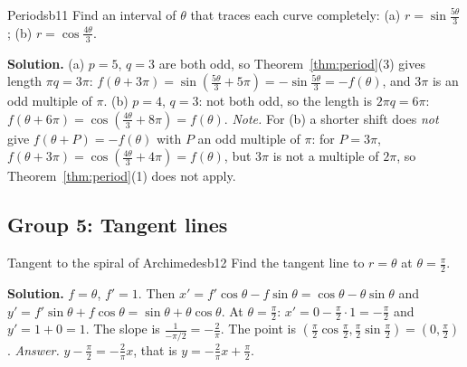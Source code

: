 \documentclass[11pt]{article}
\begin{document}
\begin{exmp}{Periods}{b11}
Find an interval of $\theta$ that traces each curve completely: (a) $r=\sin\frac{5\theta}3$; (b) $r=\cos\frac{4\theta}3$.

\textbf{Solution.} (a) $p=5$, $q=3$ are both odd, so Theorem~\ref{thm:period}(3) gives length $\pi q=3\pi$: $f(\theta+3\pi)=\sin\left(\frac{5\theta}3+5\pi\right)=-\sin\frac{5\theta}3=-f(\theta)$, and $3\pi$ is an odd multiple of $\pi$. (b) $p=4$, $q=3$: not both odd, so the length is $2\pi q=6\pi$: $f(\theta+6\pi)=\cos\left(\frac{4\theta}3+8\pi\right)=f(\theta)$. \emph{Note.} For (b) a shorter shift does \emph{not} give $f(\theta+P)=-f(\theta)$ with $P$ an odd multiple of $\pi$: for $P=3\pi$, $f(\theta+3\pi)=\cos(\frac{4\theta}3+4\pi)=f(\theta)$, but $3\pi$ is not a multiple of $2\pi$, so Theorem~\ref{thm:period}(1) does not apply.
\end{exmp}

\subsection*{Group 5: Tangent lines}

\begin{exmp}{Tangent to the spiral of Archimedes}{b12}
Find the tangent line to $r=\theta$ at $\theta=\frac\pi2$.

\textbf{Solution.} $f=\theta$, $f'=1$. Then $x'=f'\cos\theta-f\sin\theta=\cos\theta-\theta\sin\theta$ and $y'=f'\sin\theta+f\cos\theta=\sin\theta+\theta\cos\theta$. At $\theta=\frac\pi2$: $x'=0-\frac\pi2\cdot1=-\frac\pi2$ and $y'=1+0=1$. The slope is $\frac{1}{-\pi/2}=-\frac2\pi$. The point is $\left(\frac\pi2\cos\frac\pi2,\frac\pi2\sin\frac\pi2\right)=\left(0,\frac\pi2\right)$. \emph{Answer.} $y-\frac\pi2=-\frac2\pi x$, that is $y=-\frac2\pi x+\frac\pi2$.
\end{exmp}
\end{document}
